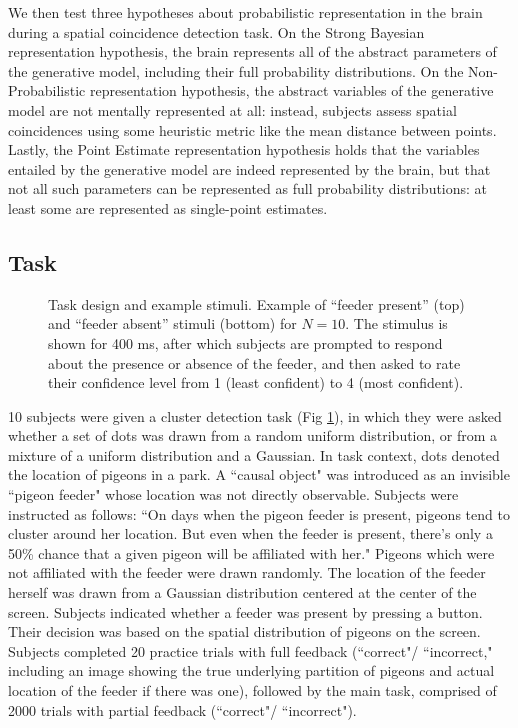 \documentclass{article}
\begin{document}
We then test three hypotheses about probabilistic representation in the brain during a spatial coincidence detection task. On the Strong Bayesian representation hypothesis, the brain represents all of the abstract parameters of the generative model, including their full probability distributions. On the Non-Probabilistic representation hypothesis, the abstract variables of the generative model are not mentally represented at all: instead, subjects assess spatial coincidences using some heuristic metric like the mean distance between points. Lastly, the Point Estimate representation hypothesis holds that the variables entailed by the generative model are indeed represented by the brain, but that not all such parameters can be represented as full probability distributions: at least some are represented as single-point estimates. 

\subsection*{Task}
\begin{figure}[ht]
\begin{center}
   \caption{Task design and example stimuli. Example of ``feeder present'' (top) and ``feeder absent'' stimuli (bottom) for $N=10$. The stimulus is shown for 400 ms, after which subjects are prompted to respond about the presence or absence of the feeder, and then asked to rate their confidence level from 1 (least confident) to 4 (most confident).} 
   \label{fig:taskdisplay}
\end{center}
\end{figure}

10 subjects were given a cluster detection task (Fig \ref{fig:taskdisplay}), in which they were asked whether a set of dots was drawn from a random uniform distribution, or from a mixture of a uniform distribution and a Gaussian. In task context, dots denoted the location of pigeons in a park. A ``causal object" was introduced as an invisible ``pigeon feeder" whose location was not directly observable. Subjects were instructed as follows: ``On days when the pigeon feeder is present, pigeons tend to cluster around her location. But even when the feeder is present, there's only a 50\% chance that a given pigeon will be affiliated with her." Pigeons which were not affiliated with the feeder were drawn randomly. The location of the feeder herself was drawn from a Gaussian distribution centered at the center of the screen. Subjects indicated whether a feeder was present by pressing a button. Their decision was based on the spatial distribution of pigeons on the screen. Subjects completed 20 practice trials with full feedback (``correct"/ ``incorrect," including an image showing the true underlying partition of pigeons and actual location of the feeder if there was one), followed by the main task, comprised of 2000 trials with partial feedback (``correct"/ ``incorrect").
\end{document}
